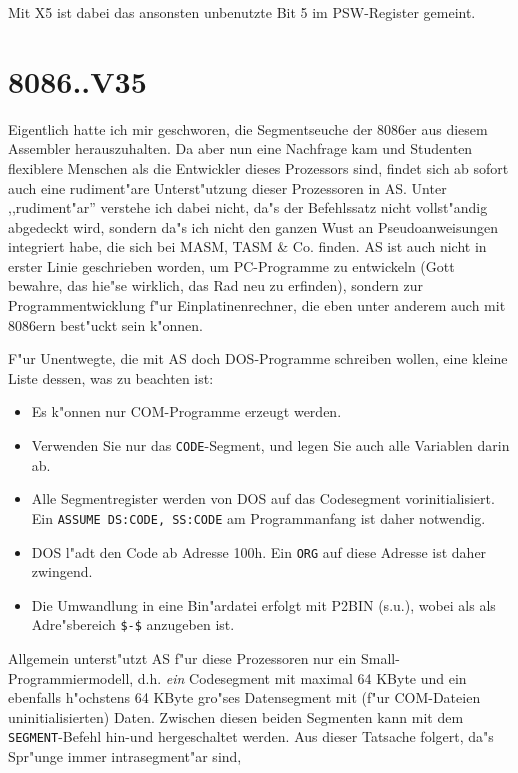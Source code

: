 \documentclass[12pt,a4paper,twoside]{report}
\newcommand{\ii}[1]{{\it #1}}
\newcommand{\tty}[1]{{\tt #1}}
\begin{document}
Mit X5 ist dabei das ansonsten unbenutzte Bit 5 im PSW-Register gemeint.


\section{8086..V35}

Eigentlich hatte ich mir geschworen, die Segmentseuche der 8086er aus diesem
Assembler herauszuhalten.  Da aber nun eine Nachfrage kam und Studenten
flexiblere Menschen als die Entwickler dieses Prozessors sind, findet sich
ab sofort auch eine rudiment"are Unterst"utzung dieser Prozessoren in AS.
Unter ,,rudiment"ar'' verstehe ich dabei nicht, da"s der Befehlssatz nicht
vollst"andig abgedeckt wird, sondern da"s ich nicht den ganzen Wust an
Pseudoanweisungen integriert habe, die sich bei MASM, TASM \& Co. finden.
AS ist auch nicht in erster Linie geschrieben worden, um PC-Programme zu
entwickeln (Gott bewahre, das hie"se wirklich, das Rad neu zu erfinden),
sondern zur Programmentwicklung f"ur Einplatinenrechner, die eben unter
anderem auch mit 8086ern best"uckt sein k"onnen.
\par
F"ur Unentwegte, die mit AS doch DOS-Programme schreiben wollen, eine kleine
Liste dessen, was zu beachten ist:
\begin{itemize}
\item{Es k"onnen nur COM-Programme erzeugt werden.}
\item{Verwenden Sie nur das \tty{CODE}-Segment, und legen Sie auch alle
      Variablen darin ab.}
\item{Alle Segmentregister werden von DOS auf das Codesegment
      vorinitialisiert.  Ein \tty{ASSUME DS:CODE, SS:CODE} am
      Programmanfang ist daher notwendig.}
\item{DOS l"adt den Code ab Adresse 100h.  Ein \tty{ORG} auf diese
      Adresse ist daher zwingend.}
\item{Die Umwandlung in eine Bin"ardatei erfolgt mit P2BIN (s.u.), wobei als
      als Adre"sbereich \tty{\$-\$} anzugeben ist.}
\end{itemize}
Allgemein unterst"utzt AS f"ur diese Prozessoren nur ein Small-Programmiermodell, d.h.
\ii{ein} Codesegment mit maximal 64 KByte und ein ebenfalls h"ochstens 64
KByte gro"ses Datensegment mit (f"ur COM-Dateien uninitialisierten) Daten.
Zwischen diesen beiden Segmenten kann mit dem \tty{SEGMENT}-Befehl hin-und hergeschaltet werden.
Aus dieser Tatsache folgert, da"s Spr"unge immer intrasegment"ar sind,
\end{document}
